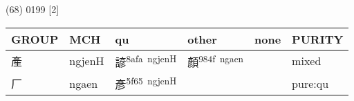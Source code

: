 \documentclass[14pt,a4paper]{scrartcl}
\begin{document}
(68) 0199 {[}2{]}

\begin{longtable}[c]{@{}llllll@{}}
\toprule
\begin{minipage}[b]{0.14\columnwidth}\raggedright\strut
GROUP
\strut\end{minipage} &
\begin{minipage}[b]{0.14\columnwidth}\raggedright\strut
MCH
\strut\end{minipage} &
\begin{minipage}[b]{0.14\columnwidth}\raggedright\strut
qu
\strut\end{minipage} &
\begin{minipage}[b]{0.14\columnwidth}\raggedright\strut
other
\strut\end{minipage} &
\begin{minipage}[b]{0.14\columnwidth}\raggedright\strut
none
\strut\end{minipage} &
\begin{minipage}[b]{0.14\columnwidth}\raggedright\strut
PURITY
\strut\end{minipage}\tabularnewline
\midrule
\endhead
\begin{minipage}[t]{0.14\columnwidth}\raggedright\strut
產
\strut\end{minipage} &
\begin{minipage}[t]{0.14\columnwidth}\raggedright\strut
ngjenH
\strut\end{minipage} &
\begin{minipage}[t]{0.14\columnwidth}\raggedright\strut
諺\textsuperscript{8afa~ngjenH}
\strut\end{minipage} &
\begin{minipage}[t]{0.14\columnwidth}\raggedright\strut
顏\textsuperscript{984f~ngaen}
\strut\end{minipage} &
\begin{minipage}[t]{0.14\columnwidth}\raggedright\strut
\strut\end{minipage} &
\begin{minipage}[t]{0.14\columnwidth}\raggedright\strut
mixed
\strut\end{minipage}\tabularnewline
\begin{minipage}[t]{0.14\columnwidth}\raggedright\strut
厂
\strut\end{minipage} &
\begin{minipage}[t]{0.14\columnwidth}\raggedright\strut
ngaen
\strut\end{minipage} &
\begin{minipage}[t]{0.14\columnwidth}\raggedright\strut
彥\textsuperscript{5f65~ngjenH}
\strut\end{minipage} &
\begin{minipage}[t]{0.14\columnwidth}\raggedright\strut
\strut\end{minipage} &
\begin{minipage}[t]{0.14\columnwidth}\raggedright\strut
\strut\end{minipage} &
\begin{minipage}[t]{0.14\columnwidth}\raggedright\strut
pure:qu
\strut\end{minipage}\tabularnewline
\bottomrule
\end{longtable}
\end{document}
